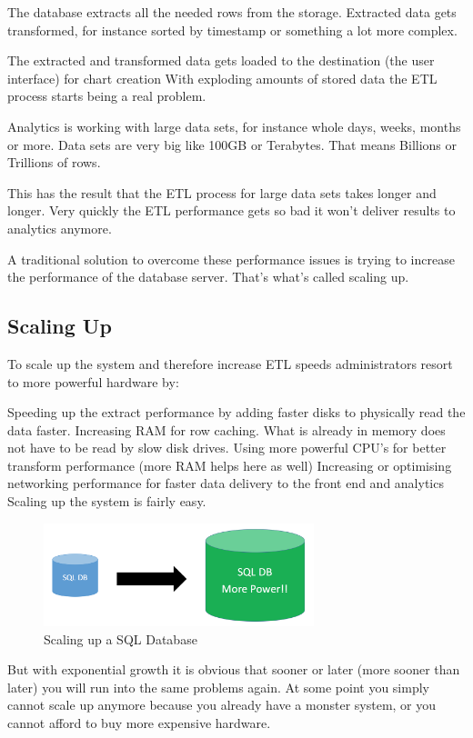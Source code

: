 \documentclass[12pt, numbers=noenddot]{scrreprt} %
\begin{document}
The database extracts all the needed rows from the storage. Extracted data gets transformed, for instance sorted by timestamp or something a lot more complex.

The extracted and transformed data gets loaded to the destination (the user interface) for chart creation
With exploding amounts of stored data the ETL process starts being a real problem.

Analytics is working with large data sets, for instance whole days, weeks, months or more. Data sets are very big like 100GB or Terabytes. That means Billions or Trillions of rows.

This has the result that the ETL process for large data sets takes longer and longer. Very quickly the ETL performance gets so bad it won’t deliver results to analytics anymore.

A traditional solution to overcome these performance issues is trying to increase the performance of the database server. That’s what’s called scaling up.

\subsection{Scaling Up}
To scale up the system and therefore increase ETL speeds administrators resort to more powerful hardware by:

Speeding up the extract performance by adding faster disks to physically read the data faster.
Increasing RAM for row caching. What is already in memory does not have to be read by slow disk drives.
Using more powerful CPU’s for better transform performance (more RAM helps here as well)
Increasing or optimising networking performance for faster data delivery to the front end and analytics
Scaling up the system is fairly easy.

\begin{figure}[htbp]
  \centering
     \includegraphics[width=0.7\textwidth]{images/SQL-Scaling-UP}
  \caption{Scaling up a SQL Database}
  \label{fig:Bild1}
\end{figure}

But with exponential growth it is obvious that sooner or later (more sooner than later) you will run into the same problems again. At some point you simply cannot scale up anymore because you already have a monster system, or you cannot afford to buy more expensive hardware.
\end{document}
